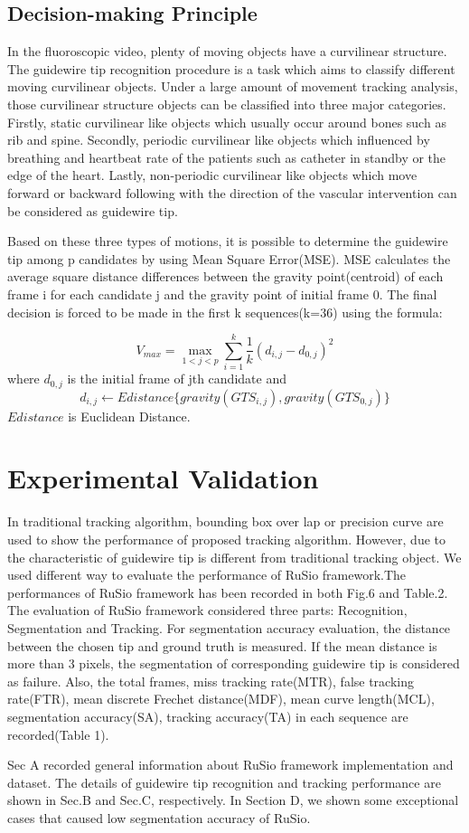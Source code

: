\documentclass[journal]{IEEEtran}
\begin{document}
\subsection{Decision-making Principle}
In the fluoroscopic video, plenty of moving objects have a curvilinear structure. The guidewire tip recognition procedure is a task which aims to classify different moving curvilinear objects. Under a large amount of movement tracking analysis, those curvilinear structure objects can be classified into three major categories. Firstly, static curvilinear like objects which usually occur around bones such as rib and spine. Secondly, periodic curvilinear like objects which influenced by breathing and heartbeat rate of the patients such as catheter in standby or the edge of the heart. Lastly, non-periodic curvilinear like objects which move forward or backward following with the direction of the vascular intervention can be considered as guidewire tip. 

Based on these three types of motions, it is possible to determine the guidewire tip among p candidates by using Mean Square Error(MSE). MSE calculates the average square distance differences between the gravity point(centroid) of each frame i for each candidate j and the gravity point of initial frame 0. The final decision is forced to be made in the first k sequences(k=36) using the formula: 

$$ V_{max} = \max\limits_{1<j<p} {\sum_{i=1} ^k \frac{1}{k} (d_{i,j}-d_{0,j})^2} $$
where $d_{0,j}$ is the initial frame of jth candidate and 
$$ d_{i,j} \leftarrow Edistance\Big\{gravity(GTS_{i,j}),gravity(GTS_{0,j}) \Big\}$$
$Edistance$ is Euclidean Distance.


\section{Experimental Validation}
In traditional tracking algorithm, bounding box over lap \cite{Henriques2014High} or precision curve \cite{Babenko2011Robust} are used to show the performance of proposed tracking algorithm. However, due to the characteristic of guidewire tip is different from traditional tracking object. We used different way to evaluate the performance of RuSio framework.The performances of RuSio framework has been recorded in both Fig.6 and Table.2. The evaluation of RuSio framework considered three parts: Recognition, Segmentation and Tracking. For segmentation accuracy evaluation, the distance between the chosen tip and ground truth is measured. If the mean distance is more than 3 pixels, the segmentation of corresponding guidewire tip is considered as failure. Also, the total frames, miss tracking rate(MTR), false tracking rate(FTR), mean discrete Frechet distance(MDF), mean curve length(MCL), segmentation accuracy(SA), tracking accuracy(TA) in each sequence are recorded(Table 1).
\par
Sec A recorded general information about RuSio framework implementation and dataset. The details of guidewire tip recognition and tracking performance are shown in Sec.B and Sec.C, respectively. In Section D, we shown some exceptional cases that caused low segmentation accuracy of RuSio. 
\end{document}
